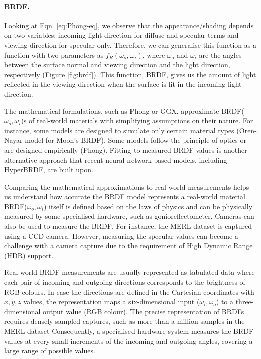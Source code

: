 \paragraph{BRDF.} 
Looking at Eqn. \ref{eq:Phong-eq}, we observe that the appearance/shading depends on two variables: incoming light direction for diffuse and specular terms and viewing direction for specular only. Therefore, we can generalise this function as a function with two parameters as  $f_R(\omega_o, \omega_i)$, where  $\omega_o$ and $\omega_i$ are the angles between the surface normal and viewing direction and the light direction, respectively (Figure \ref{fig:brdf}). This function, \gls{BRDF}, gives us the amount of light reflected in the viewing direction when the surface is lit in the incoming light direction.

The mathematical formulations, such as Phong or GGX, approximate BRDF($\omega_o, \omega_i$)s of real-world materials with simplifying assumptions on their nature. For instance, some models are designed to simulate only certain material types (Oren-Nayar model for Moon's \gls{BRDF}). Some models follow the principle of optics or are designed empirically (Phong). Fitting to measured \gls{BRDF} values is another alternative approach that recent neural network-based models, including HyperBRDF, are built upon.  

Comparing the mathematical approximations to real-world measurements helps us understand how accurate the \gls{BRDF} model represents a real-world material. BRDF($\omega_o, \omega_i$) itself is defined based on the laws of physics and can be physically measured by some specialised hardware, such as gonioreflectometer. Cameras can also be used to measure the \gls{BRDF}. For instance, the MERL dataset \cite{Matusik2003jul} is captured using a CCD camera. However, measuring the specular values can become a challenge with a camera capture due to the requirement of High Dynamic Range (\gls{HDR}) support. 


Real-world \gls{BRDF} measurements are usually represented as tabulated data where each pair of incoming and outgoing directions corresponds to the brightness of RGB colours. In case the directions are defined in the Cartesian coordinates with $x, y, z$ values, the representation maps a six-dimensional input ($\omega_i, \omega_o$) to a three-dimensional output value (RGB colour). The precise representation of \gls{BRDF}s requires densely sampled captures, such as more than a million samples in the MERL dataset \cite{Matusik2003jul} Consequently, a specialised hardware system measures the \gls{BRDF} values at every small increments of the incoming and outgoing angles, covering a large range of possible values. 

